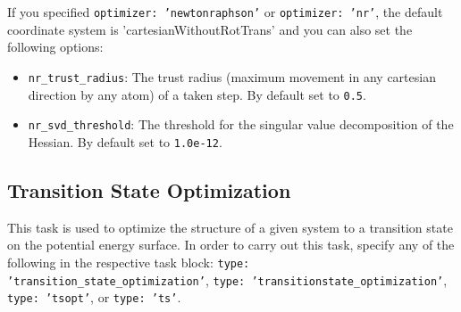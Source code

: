 \documentclass[]{tufte-book}
\begin{document}
If you specified \texttt{optimizer: 'newtonraphson'} or \texttt{optimizer: 'nr'}, the default coordinate system is 'cartesianWithoutRotTrans'
and you can also set the following options:
\begin{itemize}
\item \texttt{nr\_trust\_radius}: The trust radius (maximum movement in any cartesian direction by any atom) of a taken step.
By default set to \texttt{0.5}.
\item \texttt{nr\_svd\_threshold}: The threshold for the singular value decomposition of the Hessian. By default set to
\texttt{1.0e-12}.
\end{itemize}

\subsection{Transition State Optimization}

This task is used to optimize the structure of a given system to a transition state on the potential energy surface. In
order to carry out this task, specify any of the following in the respective task block: \texttt{type: 'transition\_state\_optimization'},
\texttt{type: 'transitionstate\_optimization'}, \texttt{type: 'tsopt'}, or \texttt{type: 'ts'}.
\end{document}
